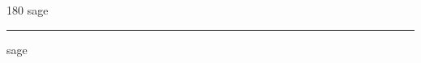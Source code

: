 
\begin{frame}
\begin{center}
\begin{turn}{180}
{\fontsize{2.5cm}{1em}\selectfont sage}
\end{turn}
\vspace{1em}\par  
\hrule
\vspace{1em}\par  
{\fontsize{2.5cm}{1em}\selectfont sage}
\end{center}
\end{frame}
